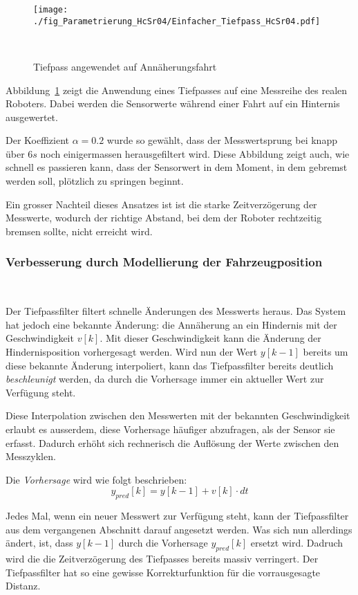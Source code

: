 \documentclass[main.tex]{subfiles} %
\begin{document}
\begin{figure}[H]
    \centering
    \texttt{[image: ./fig\_Parametrierung\_HcSr04/Einfacher\_Tiefpass\_HcSr04.pdf]}
    \caption{Tiefpass angewendet auf Annäherungsfahrt}~\label{fig:EinfacherTiefpassHcSr04}
\end{figure}

Abbildung~\ref{fig:EinfacherTiefpassHcSr04} zeigt die Anwendung eines
Tiefpasses auf eine Messreihe des realen Roboters. Dabei werden die Sensorwerte
während einer Fahrt auf ein Hinternis ausgewertet.

Der Koeffizient $\alpha = 0.2$ wurde so gewählt, dass der Messwertsprung bei
knapp über $6s$ noch einigermassen herausgefiltert wird. Diese Abbildung zeigt
auch, wie schnell es passieren kann, dass der Sensorwert in dem Moment, in dem
gebremst werden soll, plötzlich zu springen beginnt.

Ein grosser Nachteil dieses Ansatzes ist ist die starke Zeitverzögerung der
Messwerte, wodurch der richtige Abstand, bei dem der Roboter rechtzeitig
bremsen sollte, nicht erreicht wird.

\subsubsection*{Verbesserung durch Modellierung der Fahrzeugposition}~\label{apdx:Adaptiver_Tiefpass}

Der Tiefpassfilter filtert schnelle Änderungen des Messwerts heraus. Das System
hat jedoch eine bekannte Änderung: die Annäherung an ein Hindernis mit der
Geschwindigkeit $v[k]$. Mit dieser Geschwindigkeit kann die Änderung der
Hindernisposition vorhergesagt werden. Wird nun der Wert $y[k - 1]$ bereits um
diese bekannte Änderung interpoliert, kann das Tiefpassfilter bereits deutlich
\textit{beschleunigt} werden, da durch die Vorhersage immer ein aktueller Wert
zur Verfügung steht.

Diese Interpolation zwischen den Messwerten mit der bekannten Geschwindigkeit
erlaubt es ausserdem, diese Vorhersage häufiger abzufragen, als der Sensor sie
erfasst. Dadurch erhöht sich rechnerisch die Auflösung der Werte zwischen den
Messzyklen.

Die \textit{Vorhersage} wird wie folgt beschrieben:
\[
    y_{pred}[k] = y[k - 1] + v[k] \cdot dt
\]

Jedes Mal, wenn ein neuer Messwert zur Verfügung steht, kann der Tiefpassfilter
aus dem vergangenen Abschnitt darauf angesetzt werden. Was sich nun allerdings
ändert, ist, dass $y[k - 1]$ durch die Vorhersage $y_{pred}[k]$ ersetzt wird.
Dadruch wird die die Zeitverzögerung des Tiefpasses bereits massiv verringert.
Der Tiefpassfilter hat so eine gewisse Korrekturfunktion für die vorrausgesagte
Distanz.
\end{document}
